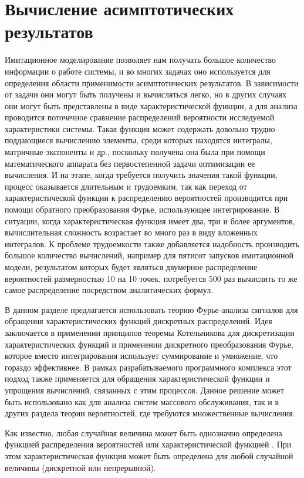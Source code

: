\section {Вычисление асимптотических результатов}
Имитационное моделирование позволяет нам получать большое количество информации о работе системы, и во многих задачах оно используется для определения области применимости асимптотических результатов. В зависимости от задачи они могут быть получены и вычисляться легко, но в других случаях они могут быть представлены в виде характеристической функции, а для анализа проводится поточечное сравнение распределений вероятности исследуемой характеристики системы. Такая функция может содержать довольно трудно поддающиеся вычислению элементы, среди которых находятся интегралы, матричные экспоненты и др., поскольку получена она была при помощи математического аппарата без первостепенной задачи оптимизации ее вычисления. И на этапе, когда требуется получить значения такой функции, процесс оказывается длительным и трудоемким, так как переход от характеристической функции к распределению вероятностей производится при помощи обратного преобразования Фурье, использующее интегрирование. В ситуации, когда характеристическая функция имеет два, три и более аргументов, вычислительная сложность возрастает во много раз в виду вложенных интегралов. К проблеме трудоемкости также добавляется надобность производить большое количество вычислений, например для пятисот запусков имитационной модели, результатом которых будет являться двумерное распределение вероятностей размерностью 10 на 10 точек, потребуется 500 раз вычислить то же самое распределение посредством аналитических формул.

В данном разделе предлагается использовать теорию Фурье-анализа сигналов для обращения характеристических функций дискретных распределений. Идея заключается в применении принципов теоремы Котельникова \cite{ястребов2012дискретизация,kuznecov2008} для дискретизации характеристических функций и применении дискретного преобразования Фурье, которое вместо интегрирования использует суммирование и умножение, что гораздо эффективнее. В рамках разрабатываемого программного комплекса этот подход также применяется для обращения характеристической функции и упрощения вычислений, связанных с этим процессов. Данное решение может быть использовано как для анализа систем массового обслуживания, так и в других раздела теории вероятностей, где требуются множественные вычисления.

Как известно, любая случайная величина может быть однозначно определена функцией распределения вероятностей или характеристической функцией \cite{gnedenko2010}. При этом характеристическая функция может быть определена для любой случайной величины (дискретной или непрерывной).

